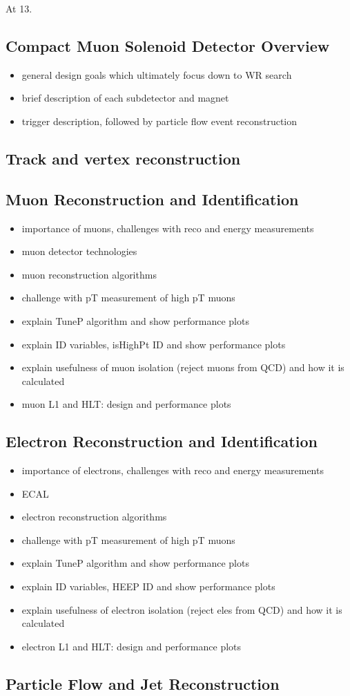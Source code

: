 At 13.



\subsection{Compact Muon Solenoid Detector Overview}
\begin{itemize}
	\item general design goals which ultimately focus down to WR search
	\item brief description of each subdetector and magnet
	\item trigger description, followed by particle flow event reconstruction
\end{itemize}

\subsection{Track and vertex reconstruction}

\subsection{Muon Reconstruction and Identification}
\begin{itemize}
	\item importance of muons, challenges with reco and energy measurements
	\item muon detector technologies
	\item muon reconstruction algorithms
	\item challenge with pT measurement of high pT muons
	\item explain TuneP algorithm and show performance plots
	\item explain ID variables, isHighPt ID and show performance plots
	\item explain usefulness of muon isolation (reject muons from QCD) and how it is calculated
	\item muon L1 and HLT: design and performance plots
\end{itemize}

\subsection{Electron Reconstruction and Identification}
\begin{itemize}
	\item importance of electrons, challenges with reco and energy measurements
	\item ECAL
	\item electron reconstruction algorithms
	\item challenge with pT measurement of high pT muons
	\item explain TuneP algorithm and show performance plots
	\item explain ID variables, HEEP ID and show performance plots
	\item explain usefulness of electron isolation (reject eles from QCD) and how it is calculated
	\item electron L1 and HLT: design and performance plots
\end{itemize}



\subsection{Particle Flow and Jet Reconstruction}



